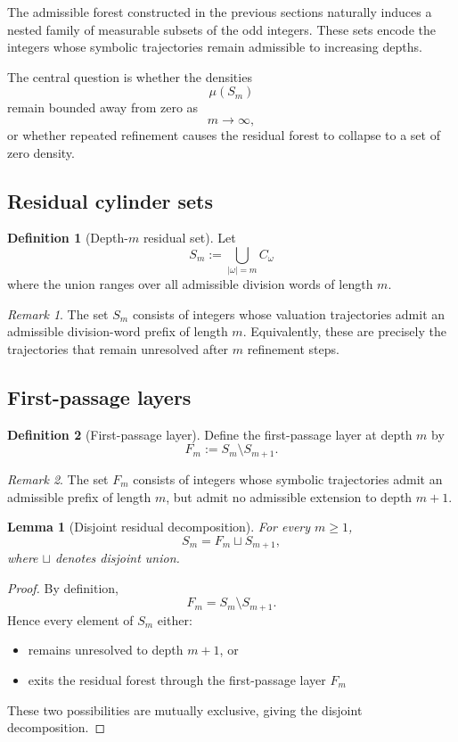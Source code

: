 \documentclass[12pt, oneside]{article}
\numberwithin{equation}{section}
\theoremstyle{definition}
\newtheorem{definition}{Definition}[section]
\theoremstyle{plain}
\newtheorem{lemma}[theorem]{Lemma}
\theoremstyle{remark}
\newtheorem*{remark}{Remark}
\begin{document}
The admissible forest constructed in the previous sections naturally
induces a nested family of measurable subsets of the odd integers.
These sets encode the integers whose symbolic trajectories remain
admissible to increasing depths.

The central question is whether the densities
\[
\mu(S_m)
\]
remain bounded away from zero as
\[
m\to\infty,
\]
or whether repeated refinement causes the residual forest to collapse
to a set of zero density.

\subsection{Residual cylinder sets}

\begin{definition}[Depth-$m$ residual set]
Let
\[
S_m := \bigcup_{|\omega|=m} C_\omega
\]
where the union ranges over all admissible division words of length \(m\).
\end{definition}

\begin{remark}
The set \(S_m\) consists of integers whose valuation trajectories admit
an admissible division-word prefix of length \(m\). Equivalently, these
are precisely the trajectories that remain unresolved after \(m\)
refinement steps.
\end{remark}

\subsection{First-passage layers}

\begin{definition}[First-passage layer]
Define the first-passage layer at depth \(m\) by
\[
F_m := S_m \setminus S_{m+1}.
\]
\end{definition}

\begin{remark}
The set \(F_m\) consists of integers whose symbolic trajectories
admit an admissible prefix of length \(m\), but admit no admissible
extension to depth \(m+1\).
\end{remark}

\begin{lemma}[Disjoint residual decomposition]
For every \(m\ge1\),
\[
S_m = F_m \sqcup S_{m+1},
\]
where \(\sqcup\) denotes disjoint union.
\end{lemma}

\begin{proof}
By definition,
\[
F_m = S_m \setminus S_{m+1}.
\]
Hence every element of \(S_m\) either:
\begin{itemize}
\item remains unresolved to depth \(m+1\), or
\item exits the residual forest through the first-passage layer \(F_m\)
\end{itemize}

These two possibilities are mutually exclusive, giving the disjoint decomposition.
\end{proof}
\end{document}
